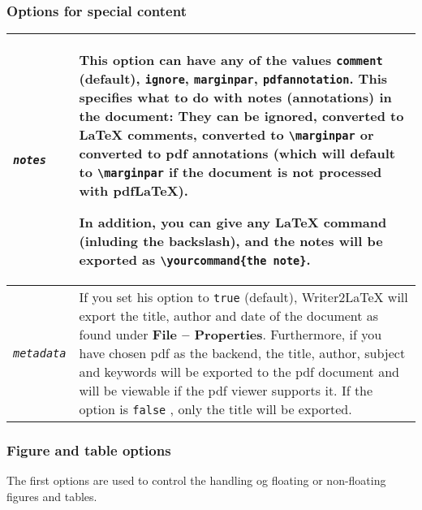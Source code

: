 \documentclass{article}
\newcommand\textstyleSourceText[1]{\texttt{\textmd{#1}}}
\begin{document}
\subsubsection{Options for special content}
\begin{center}
\begin{tabular}{|m{2.128cm}|m{14.484cm}|}

\hline
{\mdseries \textstyleSourceText{\emph{notes}}} &
{\mdseries This option can have any of the values \textstyleSourceText{comment} (default), \textstyleSourceText{ignore}, \textstyleSourceText{marginpar}, \textstyleSourceText{pdfannotation}. This specifies what to do with notes (annotations) in the document: They can be ignored, converted to LaTeX comments, converted to \textstyleSourceText{{\textbackslash}marginpar} or converted to pdf annotations (which will default to \textstyleSourceText{{\textbackslash}marginpar} if the document is not processed with pdfLaTeX).}

{\mdseries In addition, you can give any LaTeX command (inluding the backslash), and the notes will be exported as \textstyleSourceText{{\textbackslash}yourcommand\{the note\}}.}\\\hline
{\mdseries \textstyleSourceText{\emph{metadata}}} &
{\mdseries If you set his option to \textstyleSourceText{true} (default), Writer2LaTeX will export the title, author and date of the document as found under \textbf{File -- Properties}. Furthermore, if you have chosen pdf as the backend, the title, author, subject and keywords will be exported to the pdf document and will be viewable if the pdf viewer supports it. If the option is \textstyleSourceText{false} , only the title will be exported.}\\\hline
\end{tabular}
\end{center}
\subsubsection{Figure and table options}
{\mdseries
The first options are used to control the handling og floating or non-floating figures and tables.}
\end{document}
